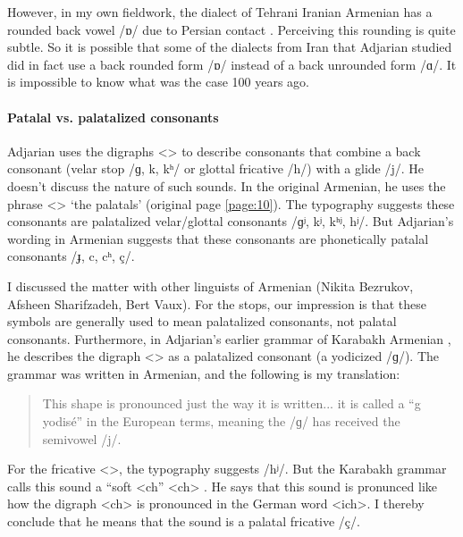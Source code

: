 	However, in my own fieldwork, the dialect of Tehrani Iranian Armenian has a rounded back vowel /ɒ/ due to Persian contact \citep[\S2.1.4]{DolatianEtAl-prep-IranianGrammar}. Perceiving this rounding is quite subtle. So it is possible that some of the dialects from Iran that Adjarian studied     did in fact use a back rounded form /ɒ/ instead of a back unrounded form /ɑ/. It is impossible to know what was the case 100 years ago.
\paragraph{Patalal vs. palatalized consonants}\label{sec:HossepIntro:phonotransc:adj:implicit:palatal}

Adjarian uses the digraphs <> to describe consonants that  combine a back consonant  (velar stop /ɡ, k, kʰ/ or glottal fricative /h/) with a glide /j/. He doesn't discuss the nature of such sounds. In the original Armenian, he uses the phrase <> `the palatals' (original page \ref{page:10}). The typography suggests these consonants are palatalized velar/glottal consonants /ɡʲ, kʲ, kʰʲ, hʲ/. But Adjarian's   wording  in Armenian suggests that these consonants are phonetically patalal consonants  /ɟ, c, cʰ, ç/. 

I discussed the matter with other linguists of Armenian (Nikita Bezrukov, Afsheen Sharifzadeh, Bert Vaux). For the stops, our impression is that these symbols are generally used to mean palatalized consonants, not palatal consonants. Furthermore, in Adjarian's earlier grammar of Karabakh Armenian \citep[18]{Adjarian-1901-Kharabagh}, he describes the digraph <> as a palatalized consonant (a yodicized /ɡ/). The grammar was written in Armenian, and the following is my translation:

\begin{quote}

This shape  is pronounced just the way it is written... it is called a ``g yodisé'' in the European terms, meaning the /ɡ/ has received the semivowel /j/. 

\end{quote}

For the fricative <>, the typography suggests /hʲ/. But the Karabakh grammar calls this sound a ``soft <ch''  <ch> \citep[24]{Adjarian-1901-Kharabagh}. He says that this sound is pronunced like how the digraph <ch> is pronounced in the German word <ich>. I thereby conclude that he means that the sound is a palatal fricative /ç/. 




